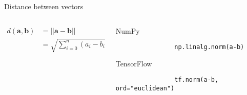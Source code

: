 \documentclass[handout]{beamer}
\begin{document}
\begin{frame}[fragile]{Distance between vectors}
    \begin{columns}
        \begin{column}{0.5\textwidth}
    \Large
    \begin{align*}
        d(\boldsymbol{a}, \boldsymbol{b}) &= ||\boldsymbol{a} - \boldsymbol{b}||\\
                                          &= \sqrt{\sum_{i=0}^n (a_{i} - b_{i})^2}
    \end{align*}
        \end{column}
        \begin{column}{0.5\textwidth}
            \begin{alertblock}{NumPy}
                \begin{lstlisting}
                np.linalg.norm(a-b)
                \end{lstlisting}
            \end{alertblock}
            \begin{alertblock}{TensorFlow}
                \begin{lstlisting}
                tf.norm(a-b, ord="euclidean")
                \end{lstlisting}
            \end{alertblock}
        \end{column}
    \end{columns}
\end{frame}
\end{document}
